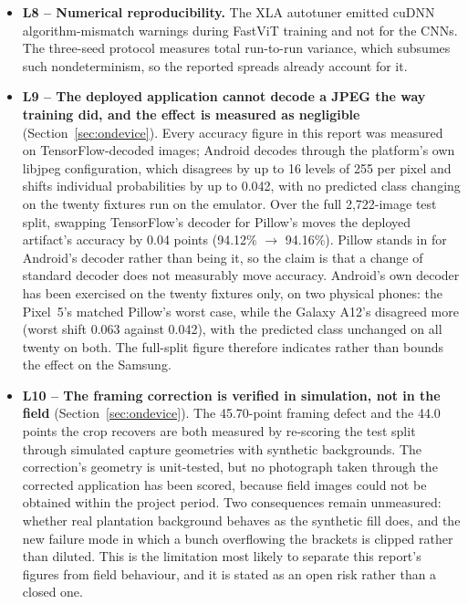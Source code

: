 \documentclass{article}
\begin{document}
\begin{itemize}
  numbers are superseded even though their internal comparisons hold.
  \item \textbf{L8 -- Numerical reproducibility.} The XLA autotuner emitted cuDNN algorithm-mismatch
  warnings during FastViT training and not for the CNNs. The three-seed protocol measures total
  run-to-run variance, which subsumes such nondeterminism, so the reported spreads already account for it.
  \item \textbf{L9 -- The deployed application cannot decode a JPEG the way training did, and the effect
  is measured as negligible} (Section~\ref{sec:ondevice}). Every accuracy figure in this report was
  measured on TensorFlow-decoded images; Android decodes through the platform's own libjpeg configuration,
  which disagrees by up to 16 levels of 255 per pixel and shifts individual probabilities by up to 0.042,
  with no predicted class changing on the twenty fixtures run on the emulator. Over the full 2,722-image
  test split, swapping TensorFlow's decoder for Pillow's moves the deployed artifact's accuracy by 0.04
  points (94.12\% $\rightarrow$ 94.16\%). Pillow stands in for Android's decoder rather than being it, so
  the claim is that a change of standard decoder does not measurably move accuracy. Android's own decoder
  has been exercised on the twenty fixtures only, on two physical phones: the Pixel~5's matched Pillow's
  worst case, while the Galaxy A12's disagreed more (worst shift 0.063 against 0.042), with the predicted
  class unchanged on all twenty on both. The full-split figure therefore indicates rather than bounds the
  effect on the Samsung.
  \item \textbf{L10 -- The framing correction is verified in simulation, not in the field}
  (Section~\ref{sec:ondevice}). The 45.70-point framing defect and the 44.0 points the crop recovers are
  both measured by re-scoring the test split through simulated capture geometries with synthetic
  backgrounds. The correction's geometry is unit-tested, but no photograph taken through the corrected
  application has been scored, because field images could not be obtained within the project period. Two
  consequences remain unmeasured: whether real plantation background behaves as the synthetic fill does,
  and the new failure mode in which a bunch overflowing the brackets is clipped rather than diluted. This
  is the limitation most likely to separate this report's figures from field behaviour, and it is stated
  as an open risk rather than a closed one.
\end{itemize}
\end{document}
